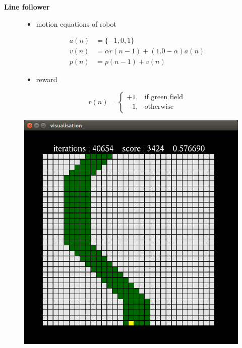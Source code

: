 \documentclass[xcolor=dvipsnames]{beamer}
\begin{document}
\begin{frame}{\bf Line follower}


\begin{figure}
\centering
\begin{minipage}{.5\textwidth}

\begin{itemize}

\item motion equations of robot

\begin{align*}
a(n) &= \{-1, 0, 1\} \\
v(n) &= \alpha r(n-1) + (1.0 - \alpha) a(n) \\
p(n) &= p(n-1) + v(n)
\end{align*}

\item reward

\[
    r(n)=
\begin{cases}
    +1,& \text{if green field}\\
    -1, & \text{otherwise}
\end{cases}
\]


\end{itemize}

\end{minipage}%
\begin{minipage}{.45\textwidth}
  \includegraphics[scale=0.2]{../pictures/rl_race.png}
\end{minipage}
\end{figure}



\end{frame}
\end{document}
